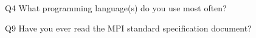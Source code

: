 \begin{description}%
\item{Q4} What programming language(s) do you use most often?%
\item{Q9} Have you ever read the MPI standard specification document?%
\end{description}%
